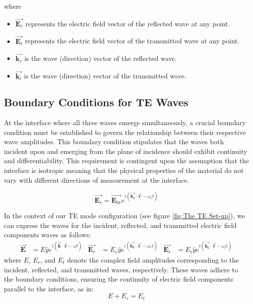 where
\begin{itemize}
    \item $\vec{\mathbf{E}_r}$ represents the electric field vector of the reflected wave at any point.
    \item $\vec{\mathbf{E}_t}$ represents the electric field vector of the transmitted wave at any point.
    \item $\vec{\mathbf{k}_r}$ is the wave (direction) vector of the reflected wave.
    \item $\vec{\mathbf{k}_t}$ is the wave (direction) vector of the transmitted wave.
\end{itemize}

\subsection{Boundary Conditions for TE Waves}
At the interface where all three waves emerge simultaneously, a crucial boundary condition must be established to govern the relationship between their respective wave amplitudes. This boundary condition stipulates that the waves both incident upon and emerging from the plane of incidence should exhibit continuity and differentiability. This requirement is contingent upon the assumption that the interface is isotropic meaning that the physical properties of the material do not vary with different directions of measurement at the interface.

\begin{equation} \label{Plane harmonic wave equation - reflected}
\vec{\mathbf{E}_r} = \vec{\mathbf{E}_{0r}} e^{i(\vec{\mathbf{k_r}} \cdot \vec{\mathbf{r}} - \omega_r t)}
\end{equation}

In the context of our TE mode configuration (see figure \ref{fig:The TE Set-up}), we can express the waves for the incident, reflected, and transmitted electric field components waves as follows:
    \begin{align*}
    \vec{\mathbf{E}} &= E \hat{y} e^{i(\vec{\mathbf{k}} \cdot \vec{\mathbf{r}} - \omega t)}           &  \vec{\mathbf{E}_r} &= E_r \hat{y} e^{i(\vec{\mathbf{k_r}} \cdot \vec{\mathbf{r}} - \omega_r t)}               &  \vec{\mathbf{E}_t} &= E_t \hat{y} e^{i(\vec{\mathbf{k_t}} \cdot \vec{\mathbf{r}} - \omega_t t)}
    \end{align*}
where $E$, $E_r$, and $E_t$ denote the complex field amplitudes corresponding to the incident, reflected, and transmitted waves, respectively. These waves adhere to the boundary conditions, ensuring the continuity of electric field components parallel to the interface, as in:
\begin{equation} \label{Electric field boundary conditions for TE waves}
E + E_r = E_t
\end{equation}

